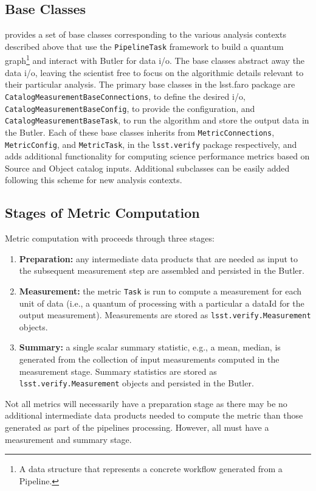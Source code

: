 \subsection{Base Classes} \label{ssec:base_classes}

\faro provides a set of base classes corresponding to the various analysis contexts described above that use the \texttt{PipelineTask} framework to build a quantum graph\footnote{A data structure that represents a concrete workflow generated from a Pipeline.} and interact with Butler for data i/o.
The base classes abstract away the data i/o, leaving the scientist free to focus on the algorithmic details  relevant to their particular analysis.
The primary base classes in the lsst.faro package are \texttt{CatalogMeasurementBaseConnections}, to define the desired i/o, \texttt{CatalogMeasurementBaseConfig}, to provide the configuration, and \texttt{CatalogMeasurementBaseTask}, to run the algorithm and store the output data in the Butler.
Each of these base classes inherits from \texttt{MetricConnections}, \texttt{MetricConfig}, and \texttt{MetricTask}, in the \texttt{lsst.verify} package respectively, and adds additional functionality for computing science performance metrics based on Source and Object catalog inputs.
Additional subclasses can be easily added following this scheme for new analysis contexts.

\subsection{Stages of Metric Computation} \label{ssec:stages}

Metric computation with \faro proceeds through three stages:
\begin{enumerate}
\item \textbf{Preparation:} any intermediate data products that are needed as input to the subsequent measurement step are assembled and persisted in the Butler.
\item \textbf{Measurement:} the metric \texttt{Task} is run to compute a measurement for each unit of data (i.e., a quantum of processing with a particular a dataId for the output measurement). Measurements are stored as \texttt{lsst.verify.Measurement} objects.
\item \textbf{Summary:} a single scalar summary statistic, e.g., a mean, median,  is generated from the collection of input measurements computed in the measurement stage. Summary statistics are stored as \texttt{lsst.verify.Measurement} objects and persisted in the Butler.
\end{enumerate}
Not all metrics will necessarily have a preparation stage as there may be no additional intermediate data products needed to compute the metric than those generated as part of the pipelines processing. However, all must have a measurement and summary stage.

